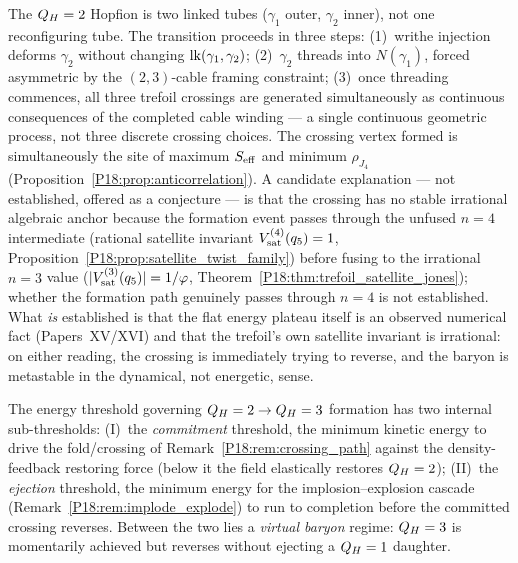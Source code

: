 \begin{remark}[Kinematic path of the $\QH=2\to\QH=3$ transition]
\label{P18:rem:crossing_path}
The $Q_H=2$ Hopfion is two linked tubes ($\gamma_1$ outer,
$\gamma_2$ inner), not one reconfiguring tube. The transition
proceeds in three steps: (1)~writhe injection deforms $\gamma_2$
without changing $\mathrm{lk}(\gamma_1,\gamma_2)$; (2)~$\gamma_2$ threads
into $N(\gamma_1)$, forced asymmetric by the $(2,3)$-cable framing
constraint; (3)~once threading commences, all three trefoil
crossings are generated simultaneously as continuous consequences
of the completed cable winding --- a single continuous geometric
process, not three discrete crossing choices. The crossing vertex
formed is simultaneously the site of maximum $S_{\rm eff}$ and
minimum $\rho_{J_4}$ (Proposition~\ref{P18:prop:anticorrelation}). A
candidate explanation --- not established, offered as a conjecture
--- is that the crossing has no stable irrational algebraic anchor
because the formation event passes through the unfused $n=4$
intermediate (rational satellite invariant
$V_{\mathrm{sat}}^{(4)}(q_5)=1$,
Proposition~\ref{P18:prop:satellite_twist_family}) before fusing to
the irrational $n=3$ value ($|V_{\mathrm{sat}}^{(3)}(q_5)|=1/\varphi$,
Theorem~\ref{P18:thm:trefoil_satellite_jones}); whether the formation
path genuinely passes through $n=4$ is not established. What
\emph{is} established is that the flat energy plateau itself is an
observed numerical fact (Papers~XV/XVI) and that the trefoil's own
satellite invariant is irrational: on either reading, the crossing
is immediately trying to reverse, and the baryon is metastable in
the dynamical, not energetic, sense.
\end{remark}

\begin{remark}
\label{P18:rem:two_thresholds}
The energy threshold governing $\QH=2\to\QH=3$ formation has two
internal sub-thresholds: (I)~the \emph{commitment} threshold, the
minimum kinetic energy to drive the fold/crossing of
Remark~\ref{P18:rem:crossing_path} against the density-feedback
restoring force (below it the field elastically restores $Q_H=2$);
(II)~the \emph{ejection} threshold, the minimum energy for the
implosion--explosion cascade (Remark~\ref{P18:rem:implode_explode}) to
run to completion before the committed crossing reverses. Between
the two lies a \emph{virtual baryon} regime: $Q_H=3$ is momentarily
achieved but reverses without ejecting a $Q_H=1$ daughter.
\end{remark}

